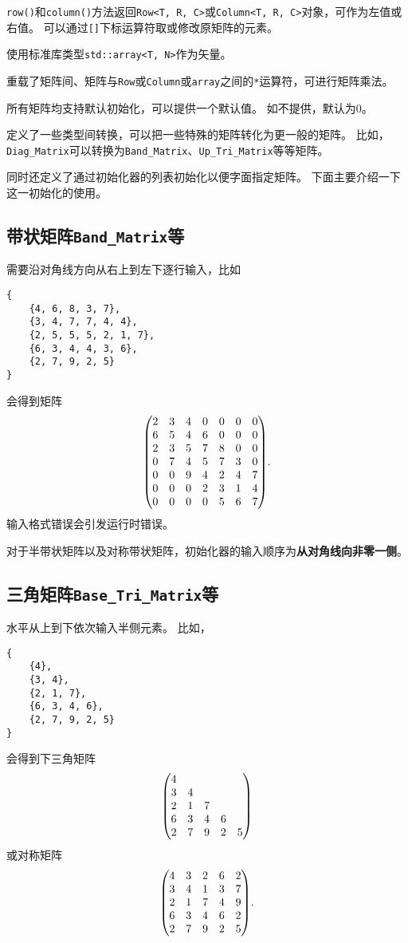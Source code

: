 \texttt{row()}和\texttt{column()}方法返回\texttt{Row<T, R, C>}或\texttt{Column<T, R, C>}对象，可作为左值或右值。
可以通过\texttt{[]}下标运算符取或修改原矩阵的元素。

使用标准库类型\texttt{std::array<T, N>}作为矢量。

重载了矩阵间、矩阵与\texttt{Row}或\texttt{Column}或\texttt{array}之间的\texttt{*}运算符，可进行矩阵乘法。

所有矩阵均支持默认初始化，可以提供一个默认值。
如不提供，默认为0。

定义了一些类型间转换，可以把一些特殊的矩阵转化为更一般的矩阵。
比如，\texttt{Diag\_Matrix}可以转换为\texttt{Band\_Matrix}、\texttt{Up\_Tri\_Matrix}等等矩阵。

同时还定义了通过初始化器的列表初始化以便字面指定矩阵。
下面主要介绍一下这一初始化的使用。

\subsection{带状矩阵\texttt{Band\_Matrix}等}
需要沿对角线方向从右上到左下逐行输入，比如
{
\small
\begin{verbatim}
{
    {4, 6, 8, 3, 7},
    {3, 4, 7, 7, 4, 4},
    {2, 5, 5, 5, 2, 1, 7},
    {6, 3, 4, 4, 3, 6},
    {2, 7, 9, 2, 5}
}
\end{verbatim}
}
会得到矩阵\[
    \mqty(
        2&3&4&0&0&0&0\\
        6&5&4&6&0&0&0\\
        2&3&5&7&8&0&0\\
        0&7&4&5&7&3&0\\
        0&0&9&4&2&4&7\\
        0&0&0&2&3&1&4\\
        0&0&0&0&5&6&7
    ).
\]
输入格式错误会引发运行时错误。

对于半带状矩阵以及对称带状矩阵，初始化器的输入顺序为\textbf{从对角线向非零一侧}。

\subsection{三角矩阵\texttt{Base\_Tri\_Matrix}等}
水平从上到下依次输入半侧元素。
比如，
{
\small
\begin{verbatim}
{
    {4},
    {3, 4},
    {2, 1, 7},
    {6, 3, 4, 6},
    {2, 7, 9, 2, 5}
}
\end{verbatim}
}
会得到下三角矩阵\[
    \mqty(
        4&&&&\\
        3&4&&&\\
        2&1&7&&\\
        6&3&4&6&\\
        2&7&9&2&5
    )
\]
或对称矩阵\[
    \mqty(
        4&3&2&6&2\\
        3&4&1&3&7\\
        2&1&7&4&9\\
        6&3&4&6&2\\
        2&7&9&2&5
    ).
\]


